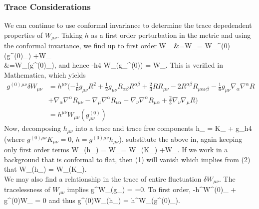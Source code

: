 \documentclass[10pt,letterpaper]{article}
\begin{document}
\subsubsection{Trace Considerations}
We can continue to use conformal invariance to determine the trace depedendent properties of $W_{\mu\nu}$. Taking $h$ as a first order perturbation in the metric and using the conformal invariance, we find up to first order 
\ba
	W_{\mu\nu} &=W_{\mu\nu}= W_{\mu\nu}^{(0)}(g^{(0)}_{\mu\nu}) +\delta W_{\mu\nu} \\
&=W_{\mu\nu}(g^{(0)}_{\mu\nu}),
\ea
and hence
\be
	-\frac h4 W_{\mu\nu}(g_{\mu\nu}^{(0)}) = \delta W_{\mu\nu}.
\ee
This is verified in Mathematica, which yields
\begin{align}
	g^{(0)}{}^{\mu\nu}\delta W_{\mu\nu} &= h^{\mu \nu} (- \tfrac{1}{6} g_{\mu \nu} R^2 + \tfrac{1}{2} g_{\mu \nu} R_{\alpha \beta} R^{\alpha \beta} + \tfrac{2}{3} R R_{\mu \nu} - 2 R^{\alpha \beta} R_{\mu \alpha \nu \beta} -  \tfrac{1}{6} g_{\mu \nu} \nabla_{\alpha}\nabla^{\alpha}R  \\
&+\nabla_{\alpha}\nabla^{\alpha}R_{\mu \nu} -  \nabla_{\mu}\nabla^{\alpha}R_{\nu \alpha} -  \nabla_{\nu}\nabla^{\alpha}R_{\mu \alpha} + \tfrac{2}{3} \nabla_{\nu}\nabla_{\mu}R)\\
	&=h^{\mu\nu}W_{\mu\nu}(g^{(0)}_{\mu\nu})
\end{align} 
Now, decomposing $h_{\mu\nu}$ into a trace and trace free components
\be
	h_{\mu\nu} = K_{\mu\nu} + g_{\mu\nu}\frac h4
\ee
(where $g^{(0)\mu\nu}K_{\mu\nu} = 0$, $h= g^{(0)\mu\nu}h_{\mu\nu}$), substitute the above in, again keeping only first order terms
\be
	\delta W_{\mu\nu}(h_{\mu\nu}) = \delta W_{\mu\nu}= \delta W_{\mu\nu}(K_{\mu\nu}) +\delta W_{\mu\nu}.
\ee
If we work in a background that is conformal to flat, then (1) will vanish which implies from (2) that
\be
	\delta W_{\mu\nu}(h_{\mu\nu}) = \delta W_{\mu\nu}(K_{\mu\nu}).
\ee
\\
We may also find a relationship in the trace of entire fluctuation $\delta W_{\mu\nu}$. The tracelessness of $W_{\mu\nu}$ implies
\be
	g^{\mu\nu}W_{\mu\nu}(g_{\mu\nu}) = =0.
\ee
To first order,
\be
	-h^{\mu\nu}W^{(0)}_{\mu\nu} + g^{(0)\mu\nu}\delta W_{\mu\nu} = 0
\ee
and thus
\be
	g^{(0)\mu\nu}\delta W_{\mu\nu}(h_{\mu\nu}) = h^{\mu\nu}W_{\mu\nu}(g^{(0)}_{\mu\nu}).
\end{document}
